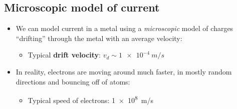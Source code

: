\documentclass[aspectratio=169,
hyperref={colorlinks,urlcolor=blue}
]{beamer}
\begin{document}
\subsection{Microscopic model of current}
\label{subsec:microscopicmodelofcurrent}
{
\begin{itemize}
 \item We can model current in a metal using a \textit{microscopic} model of charges ``drifting'' through the metal with an average velocity:
\begin{itemize}
 \item Typical \textbf{drift velocity}: $ v_d \sim \SI{1e-4}{m/s}$
 \end{itemize}
 \item In reality, electrons are moving around much faster, in mostly random directions and bouncing off of atoms:
\begin{itemize}
 \item Typical speed of electrons: \SI{1e8}{m/s}
 \end{itemize}
\end{itemize}
}
\end{document}

